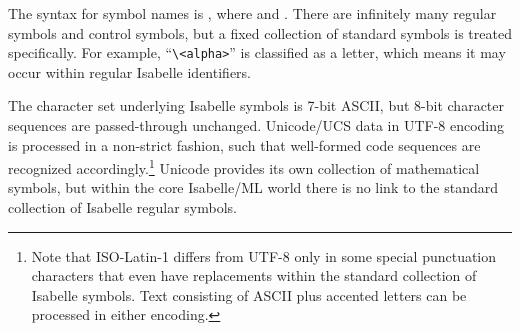 \begin{isabellebody}
\begin{isamarkuptext}
\begin{enumerate}
  \end{enumerate}

  The  syntax for symbol names is , where  and .  There are infinitely many regular symbols and
  control symbols, but a fixed collection of standard symbols is
  treated specifically.  For example, ``\verb,\,\verb,<alpha>,'' is
  classified as a letter, which means it may occur within regular
  Isabelle identifiers.

  The character set underlying Isabelle symbols is 7-bit ASCII, but
  8-bit character sequences are passed-through unchanged.  Unicode/UCS
  data in UTF-8 encoding is processed in a non-strict fashion, such
  that well-formed code sequences are recognized
  accordingly.\footnote{Note that ISO-Latin-1 differs from UTF-8 only
  in some special punctuation characters that even have replacements
  within the standard collection of Isabelle symbols.  Text consisting
  of ASCII plus accented letters can be processed in either encoding.}
  Unicode provides its own collection of mathematical symbols, but
  within the core Isabelle/ML world there is no link to the standard
  collection of Isabelle regular symbols.


\end{isamarkuptext}
\end{isabellebody}
